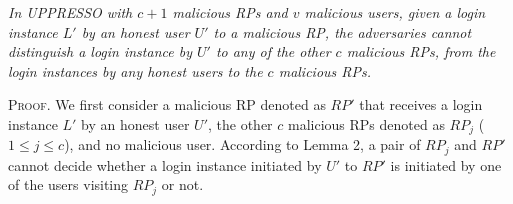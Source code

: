 

\vspace{1mm}
 {\em
In UPPRESSO with $c+1$ malicious RPs and $v$ malicious users, given a login instance $L'$ by an honest user $U'$ to a malicious RP, the adversaries cannot distinguish a login instance by $U'$ to any of the other $c$ malicious RPs, from the login instances by any honest users to the $c$ malicious RPs.}




\vspace{0.75mm}
\noindent\textsc{Proof.}
%
We first consider a malicious RP denoted as $RP'$ that receives a login instance $L'$ by an honest user $U'$, the other $c$ malicious RPs denoted as $RP_j$ ($1 \leq j \leq c$), and no malicious user.
According to Lemma 2, a pair of $RP_j$ and $RP'$ cannot decide whether a login instance initiated by $U'$ to $RP'$ is initiated by one of the users visiting $RP_j$ or not.

